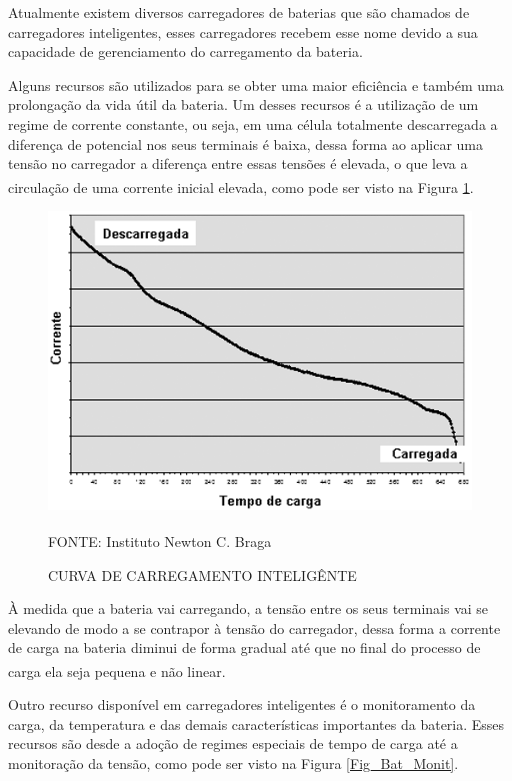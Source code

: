 \documentclass[
	12pt,				%
	openright,			%
	oneside,			%
	a4paper,			%
	english,			%
	french,				%
	spanish,			%
	brazil,				%
	oldfontcommands
	]{abntex2}
\begin{document}
	Atualmente existem diversos carregadores de baterias que são chamados de carregadores inteligentes, esses carregadores recebem esse nome devido a sua capacidade de gerenciamento do carregamento da bateria.
	
	Alguns recursos são utilizados para se obter uma maior eficiência e também uma prolongação da vida útil da bateria. Um desses recursos é a utilização de um regime de corrente constante, ou seja, em uma célula totalmente descarregada a diferença de potencial nos seus terminais é baixa, dessa forma ao aplicar uma tensão no carregador a diferença entre essas tensões é elevada, o que leva a circulação de uma corrente inicial elevada, como pode ser visto na Figura \ref{Fig_Temp_Carg}.\textsuperscript{\cite{carregador}}
	
	\begin{figure}[th]
		\caption{CURVA DE CARREGAMENTO INTELIGÊNTE}
		\label{Fig_Temp_Carg}
		\centering
		\includegraphics[width=0.67\linewidth]{./figs/temp_carg}
			
		\begin{small}
			FONTE: Instituto Newton C. Braga\textsuperscript{\cite{carregador}}
		\end{small}	
	\end{figure}
	\pagebreak

	À medida que a bateria vai carregando, a tensão entre os seus terminais vai se elevando de modo a se contrapor à tensão do carregador, dessa forma a corrente de carga na bateria diminui de forma gradual até que no final do processo de carga ela seja pequena e não linear.\textsuperscript{\cite{carregador}}
	
	Outro recurso disponível em carregadores inteligentes é o monitoramento da carga, da temperatura e das demais características importantes da bateria. Esses recursos são desde a adoção de regimes especiais de tempo de carga até a monitoração da tensão, como pode ser visto na Figura \ref{Fig_Bat_Monit}.
\end{document}
